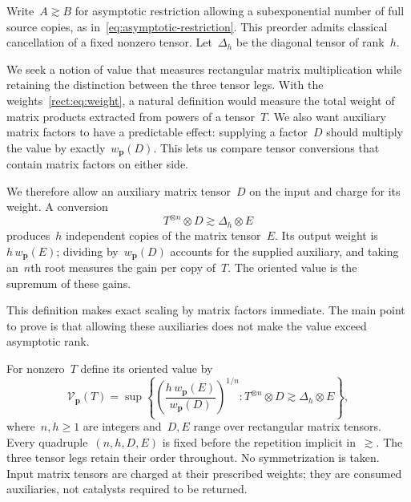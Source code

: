 \documentclass[11pt,letterpaper]{article}
\theoremstyle{definition}
\numberwithin{equation}{section}
\begin{document}
Write~$A\gtrsim B$ for asymptotic restriction allowing a subexponential number of full source copies, as in~\eqref{eq:asymptotic-restriction}. This preorder admits classical cancellation of a fixed nonzero tensor. Let~$\Delta_h$ be the diagonal tensor of rank~$h$.

We seek a notion of value that measures rectangular matrix multiplication while retaining the distinction between the three tensor legs. With the weights~\eqref{rect:eq:weight}, a natural definition would measure the total weight of matrix products extracted from powers of a tensor~$T$. We also want auxiliary matrix factors to have a predictable effect: supplying a factor~$D$ should multiply the value by exactly~$w_{\mathbf p}(D)$. This lets us compare tensor conversions that contain matrix factors on either side.

We therefore allow an auxiliary matrix tensor~$D$ on the input and charge for its weight. A conversion
\begin{equation*}
 T^{\otimes n}\otimes D\gtrsim\Delta_h\otimes E
\end{equation*}
produces~$h$ independent copies of the matrix tensor~$E$. Its output weight is~$h\,w_{\mathbf p}(E)$; dividing by~$w_{\mathbf p}(D)$ accounts for the supplied auxiliary, and taking an~$n$th root measures the gain per copy of~$T$. The oriented value is the supremum of these gains.

This definition makes exact scaling by matrix factors immediate. The main point to prove is that allowing these auxiliaries does not make the value exceed asymptotic rank.

For nonzero~$T$ define its oriented value by
\begin{equation}\label{rect:eq:def}
 \mathcal V_{\mathbf p}(T)=
 \sup\left\{
 \left(\frac{h\,w_{\mathbf p}(E)}{w_{\mathbf p}(D)}\right)^{1/n}:
 T^{\otimes n}\otimes D\gtrsim\Delta_h\otimes E
 \right\},
\end{equation}
where~$n,h\geq1$ are integers and~$D,E$ range over rectangular matrix tensors. Every quadruple~$(n,h,D,E)$ is fixed before the repetition implicit in~$\gtrsim$. The three tensor legs retain their order throughout. No symmetrization is taken. Input matrix tensors are charged at their prescribed weights; they are consumed auxiliaries, not catalysts required to be returned.
\end{document}
